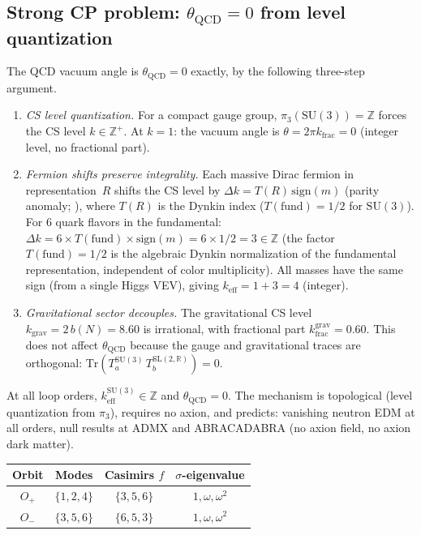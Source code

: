 \subsection{Strong CP problem: $\theta_{\mathrm{QCD}} = 0$
  from level quantization}
\label{sec:strong-cp}
The QCD vacuum angle is $\theta_{\mathrm{QCD}} = 0$
exactly, by the following three-step argument.
\begin{enumerate}
\item \emph{CS level quantization.}
  For a compact gauge group,
  $\pi_3(\mathrm{SU}(3)) = \mathbb{Z}$ forces the
  CS level $k \in \mathbb{Z}^+$.
  At $k = 1$: the vacuum angle is
  $\theta = 2\pi k_{\mathrm{frac}} = 0$
  (integer level, no fractional part).
\item \emph{Fermion shifts preserve integrality.}
  Each massive Dirac fermion in representation~$R$
  shifts the CS level by
  $\Delta k = T(R)\,\mathrm{sign}(m)$
  (parity anomaly; \citealt{Redlich1984}),
  where $T(R)$ is the Dynkin index
  ($T(\mathrm{fund}) = 1/2$ for $\mathrm{SU}(3)$).
  For $6$ quark flavors in the fundamental:
  $\Delta k = 6 \times T(\mathrm{fund})
  \times \mathrm{sign}(m) = 6 \times 1/2 = 3 \in \mathbb{Z}$
  (the factor $T(\mathrm{fund}) = 1/2$ is the algebraic
  Dynkin normalization of the fundamental representation,
  independent of color multiplicity).
  All masses have the same sign (from a single Higgs VEV),
  giving $k_{\mathrm{eff}} = 1 + 3 = 4$ (integer).
\item \emph{Gravitational sector decouples.}
  The gravitational CS level
  $k_{\mathrm{grav}} = 2\,b(N) = 8.60$ is irrational,
  with fractional part $k_{\mathrm{frac}}^{\mathrm{grav}}
  = 0.60$.
  This does not affect $\theta_{\mathrm{QCD}}$
  because the gauge and gravitational traces are
  orthogonal:
  $\mathrm{Tr}(T_a^{\mathrm{SU}(3)}\,
  T_b^{\mathrm{SL}(2,\mathbb{R})}) = 0$.
\end{enumerate}
At all loop orders,
$k_{\mathrm{eff}}^{\mathrm{SU}(3)} \in \mathbb{Z}$
and $\theta_{\mathrm{QCD}} = 0$.
The mechanism is topological (level quantization from
$\pi_3$), requires no axion, and predicts:
vanishing neutron EDM at all orders,
null results at ADMX and ABRACADABRA
(no axion field, no axion dark matter).

\begin{center}
\small
\begin{tabular}{cccc}
\toprule
Orbit & Modes & Casimirs $f$ & $\sigma$-eigenvalue \\
\midrule
$O_+$ & $\{1, 2, 4\}$ & $\{3, 5, 6\}$ & $1, \omega, \omega^2$ \\
$O_-$ & $\{3, 5, 6\}$ & $\{6, 5, 3\}$ & $1, \omega, \omega^2$ \\
\bottomrule
\end{tabular}
\end{center}

